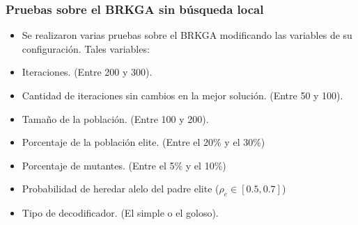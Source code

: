 \documentclass{beamer}
\begin{document}
\begin{frame}
\frametitle{Pruebas sobre el BRKGA sin búsqueda local}

\begin{itemize}
    \item Se realizaron varias pruebas sobre el BRKGA modificando las variables de su configuración. Tales variables:
    \pause
    \item Iteraciones. (Entre 200 y 300).
    \pause
    \item Cantidad de iteraciones sin cambios en la mejor solución. (Entre 50 y 100).
    \pause
    \item Tamaño de la población. (Entre 100 y 200).
    \pause
    \item Porcentaje de la población elite. (Entre el 20\% y el 30\%)
    \pause
    \item Porcentaje de mutantes. (Entre el 5\% y el 10\%)
    \pause
    \item Probabilidad de heredar alelo del padre elite ($\rho_e \in [0.5,0.7]$)
    \pause
    \item Tipo de decodificador. (El simple o el goloso).
\end{itemize}

\end{frame}

\end{document}
